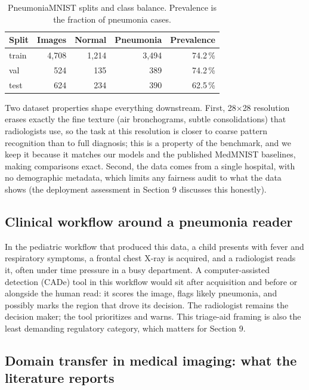 \documentclass[11pt,a4paper]{article}
\begin{document}
\begin{table}[h]
\centering
\caption{PneumoniaMNIST splits and class balance. Prevalence is the fraction of pneumonia cases.}
\label{tab:data}
\begin{tabular}{lrrrr}
\toprule
Split & Images & Normal & Pneumonia & Prevalence \\
\midrule
train & 4{,}708 & 1{,}214 & 3{,}494 & 74.2\,\% \\
val   & 524   & 135   & 389    & 74.2\,\% \\
test  & 624   & 234   & 390    & 62.5\,\% \\
\bottomrule
\end{tabular}
\end{table}

Two dataset properties shape everything downstream. First, 28$\times$28 resolution erases exactly the fine texture (air bronchograms, subtle consolidations) that radiologists use, so the task at this resolution is closer to coarse pattern recognition than to full diagnosis; this is a property of the benchmark, and we keep it because it matches our models and the published MedMNIST baselines, making comparisons exact. Second, the data comes from a single hospital, with no demographic metadata, which limits any fairness audit to what the data shows (the deployment assessment in Section 9 discusses this honestly).

\subsection{Clinical workflow around a pneumonia reader}

In the pediatric workflow that produced this data, a child presents with fever and respiratory symptoms, a frontal chest X-ray is acquired, and a radiologist reads it, often under time pressure in a busy department. A computer-assisted detection (CADe) tool in this workflow would sit after acquisition and before or alongside the human read: it scores the image, flags likely pneumonia, and possibly marks the region that drove its decision. The radiologist remains the decision maker; the tool prioritizes and warns. This triage-aid framing is also the least demanding regulatory category, which matters for Section 9.

\subsection{Domain transfer in medical imaging: what the literature reports}
\end{document}
